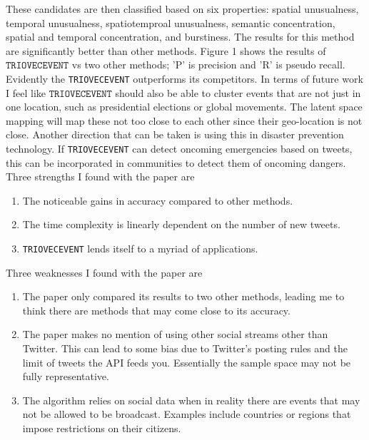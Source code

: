 \documentclass[12pt]{article}
\theoremstyle{remark}
\begin{document}
	These candidates are then classified based on six properties: spatial unusualness, temporal unusualness, spatiotemproal unusualness, semantic concentration, spatial and temporal concentration, and burstiness. The results for this method are significantly better than other methods. Figure 1 shows the results of $\texttt{TRIOVECEVENT}$ vs two other methods; 'P' is precision and 'R' is pseudo recall. Evidently the \texttt{TRIOVECEVENT} outperforms its competitors. In terms of future work I feel like $\texttt{TRIOVECEVENT}$ should also be able to cluster events that are not just in one location, such as presidential elections or global movements. The latent space mapping will map these not too close to each other since their geo-location is not close. Another direction that can be taken is using this in disaster prevention technology. If \texttt{TRIOVECEVENT} can detect oncoming emergencies based on tweets, this can be incorporated in communities to detect them of oncoming dangers. \\
	
	Three strengths I found with the paper are
	\begin{enumerate}
		\item The noticeable gains in accuracy compared to other methods.
		\item The time complexity is linearly dependent on the number of new tweets.
		\item \texttt{TRIOVECEVENT} lends itself to a myriad of applications.
	\end{enumerate} 
	\vspace{0.5cm}
	
	Three weaknesses I found with the paper are
	\begin{enumerate}
		\item The paper only compared its results to two other methods, leading me to think there are methods that may come close to its accuracy.
		\item The paper makes no mention of using other social streams other than Twitter. This can lead to some bias due to Twitter's posting rules and the limit of tweets the API feeds you. Essentially the sample space may not be fully representative. 
		\item The algorithm relies on social data when in reality there are events that may not be allowed to be broadcast. Examples include countries or regions that impose restrictions on their citizens. 
	\end{enumerate}
	\vspace{0.5cm}
	
\end{document}
